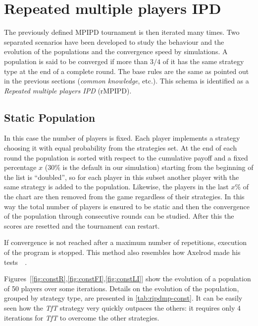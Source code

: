 \documentclass[journal,a4paper,10pt,twoside]{IEEEtran} %
\begin{document}
\section{Repeated multiple players IPD} \label{s:rIPDMP}
The previously defined MPIPD tournament is then iterated many times.
Two separated scenarios have been developed to study the behaviour and the evolution of the populations and the convergence speed by simulations. A population is said to be converged if more than $3/4$ of it has the same strategy type at the end of a complete round. The base rules are the same as pointed out in the previous sections (\textit{common knowledge},  etc.).
This schema is identified as a \textit{Repeated multiple players IPD} (rMPIPD).

\subsection{Static Population}
In this case the number of players is fixed. Each player implements a strategy choosing it with equal probability from the strategies set. At the end of each round the population is sorted with respect to the cumulative payoff and a fixed percentage $x$ ($30\%$ is the default in our simulation) starting from the beginning of the list is ``doubled'', so for each player in this subset another player with the same strategy is added to the population. Likewise, the players in the last $x\%$ of the chart are then removed from the game regardless of their strategies. In this way the total number of players is ensured to be static and then the convergence of the population through consecutive rounds can be studied. After this the scores are resetted and the tournament can restart.

If convergence is not reached after a maximum number of repetitions, execution of the program is stopped.
This method also resembles how Axelrod made his tests~\cite[\S 2.6]{mathieu2017}~\cite{axelrod1984evolution}.

Figures~[\ref{fig:constR},\ref{fig:constFI},\ref{fig:constLI}] show the evolution of a population of 50 players over some iterations.
Details on the evolution of the population, grouped by strategy type, are presented in \autoref{tab:ripdmp-const}.
It can be easily seen how the \textit{TfT} strategy very quickly outpaces the others: it requires only $4$ iterations for \textit{TfT} to overcome the other strategies.
\end{document}
